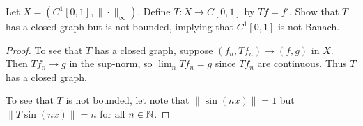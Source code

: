 \documentclass{article}
\begin{document}
 Let $X = (C^1[0,1], \|\cdot\|_\infty)$. Define $T : X \to C[0,1]$ by $Tf = f'$. Show that $T$ has a closed graph but is not bounded, implying that $C^1[0,1]$ is not Banach.

\begin{proof}
To see that $T$ has a closed graph,  suppose $(f_n, Tf_n) \to (f,g)$ in $X$.  Then $Tf_n \to g$ in the sup-norm, so $\lim_n Tf_n = g$ since $Tf_n$ are continuous.  Thus $T$ has a closed graph.

To see that $T$ is not bounded, let note that $\|\sin(nx)\| = 1$ but $\|T \sin(nx)\| = n$ for all $n \in \mathbb{N}$.

\end{proof}
\end{document}
